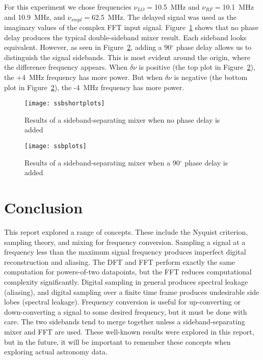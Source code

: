 \documentclass[12pt]{article}
\newcommand{\degree}{\ensuremath{^\circ} }
\begin{document}
For this experiment we chose frequencies $\nu_{LO}=$10.5~MHz and $\nu_{RF}=$10.1~MHz and 10.9~MHz, and $\nu_{smpl}=$62.5~MHz.
The delayed signal was used as the imaginary values of the complex FFT input signal.
Figure~\ref{fig:ssbshort} shows that no phase delay produces the typical double-sideband mixer result.
Each sideband looks equivalent.
However, as seen in Figure~\ref{fig:ssb}, adding a 90\degree phase delay allows us to distinguish the signal sidebands.
This is most evident around the origin, where the difference frequency appears.
When $\delta\nu$ is positive (the top plot in Figure~\ref{fig:ssb}), the +4~MHz frequency has more power.
But when $\delta\nu$ is negative (the bottom plot in Figure~\ref{fig:ssb}), the -4~MHz frequency has more power.

\begin{figure}
\centering
\texttt{[image: ssbshortplots]}
\caption{Results of a sideband-separating mixer when no phase delay is added}
\label{fig:ssbshort}
\end{figure}

\begin{figure}
\centering
\texttt{[image: ssbplots]}
\caption{Results of a sideband-separating mixer when a 90\degree phase delay is added}
\label{fig:ssb}
\end{figure}

\section{Conclusion}
This report explored a range of concepts.
These include the Nyquist criterion, sampling theory, and mixing for frequency conversion.
Sampling a signal at a frequency less than the maximum signal frequency produces imperfect digital reconstruction and aliasing.
The DFT and FFT perform exactly the same computation for powers-of-two datapoints, but the FFT reduces computational complexity significantly.
Digital sampling in general produces spectral leakage (aliasing), and digital sampling over a finite time frame produces undesirable side lobes (spectral leakage).
Frequency conversion is useful for up-converting or down-converting a signal to some desired frequency, but it must be done with care.
The two sidebands tend to merge together unless a sideband-separating mixer and FFT are used.
These well-known results were explored in this report, but in the future, it will be important to remember these concepts when exploring actual astronomy data.


\enddocument
\end{document}
